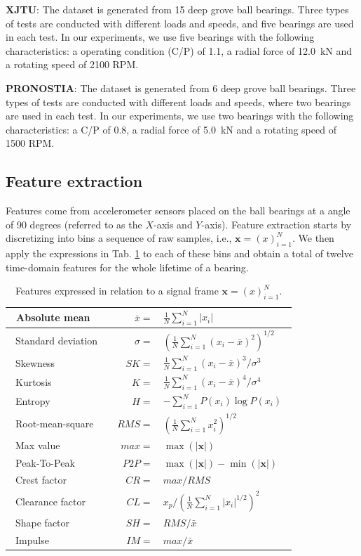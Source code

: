 \documentclass[letterpaper]{article} %
\begin{document}
\textbf{XJTU}: The dataset is generated from 15 deep grove ball bearings. Three types of tests are conducted with different loads and speeds, and five bearings are used in each test. In our experiments, we use five bearings with the following characteristics: a operating condition (C/P) of 1.1, a radial force of 12.0~kN and a rotating speed of 2100 RPM.

\textbf{PRONOSTIA}: The dataset is generated from 6 deep grove ball bearings. Three types of tests are conducted with different loads and speeds, where two bearings are used in each test. In our experiments, we use two bearings with the following characteristics: a C/P of 0.8, a radial force of 5.0~kN and a rotating speed of 1500 RPM.

\subsection{Feature extraction}

Features come from accelerometer sensors placed on the ball bearings at a angle of 90 degrees (referred to as the $X$-axis and $Y$-axis). Feature extraction starts by discretizing into bins a sequence of raw samples, i.e., $\bm{x} = (x)_{i=1}^N$. We then apply the expressions in Tab. \ref{tab:dist_tab} to each of these bins and obtain a total of twelve time-domain features for the whole lifetime of a bearing.




\begin{table}[!htbp]
\centering
\setlength\tabcolsep{1pt}
\def\arraystretch{1.5}
\begin{tabular}{|l|rl|}
\hline ~Absolute mean~ & $\bar{x}=$ & $\frac{1}{N} \sum_{i=1}^N\left|x_i\right|$ \\
\hline ~Standard deviation~ & $\sigma=$ & $ (\frac{1}{N} \sum_{i=1}^N (x_i-\bar{x})^2)^{1/2}$ \\
\hline ~Skewness~ & $SK=$ & $\frac{1}{N} \sum_{i=1}^N (x_i-\bar{x})^3 / \sigma^3$ \\
\hline ~Kurtosis~ & $K=$ & $\frac{1}{N} \sum_{i=1}^N (x_i-\bar{x})^4 / \sigma^4$ \\
\hline ~Entropy~ & $H =$ & $-\sum_{i=1}^N P(x_i) \log P(x_i)$~ \\
\hline ~Root-mean-square~ & ~$RMS=$ & $ (\frac{1}{N} \sum_{i=1}^N x_i^2)^{1/2}$ \\
\hline ~Max value~ & $max=$ & $\max(|\bm{x}|)$\\
\hline ~Peak-To-Peak~ &$P2P=$& $\max(|\bm{x}|) - \min(|\bm{x}|)$\\
\hline ~Crest factor~ &$CR=$& $max / RMS$\\
\hline ~Clearance factor~ &$CL=$ & $ x_p / (\frac{1}{N} \sum_{i=1}^N |x_i|^{1/2})^2$\\
\hline ~Shape factor~ & $SH=$ & $RMS / \bar{x}$\\
\hline ~Impulse~ & $IM=$ & $max / \bar{x}$\\
\hline
\end{tabular}
\caption{Features expressed in relation to a signal frame $\bm{x} = (x)_{i=1}^N$.}
\label{tab:dist_tab}
\end{table}
\end{document}
